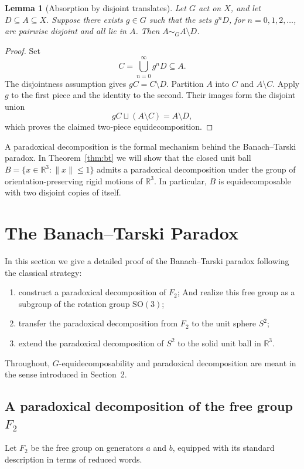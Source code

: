 \documentclass[12pt,a4paper]{article}
\theoremstyle{spaced}
\newtheorem{lemma}{Lemma}[section]
\begin{document}
\begin{lemma}[Absorption by disjoint translates]\label{lem:disjoint_translate_absorption}
	Let $G$ act on $X$, and let $D\subseteq A\subseteq X$.
	Suppose there exists $g\in G$ such that the sets $g^nD$, for
	$n=0,1,2,\dots$, are pairwise disjoint and all lie in $A$.
	Then $A\sim_G A\setminus D$.
\end{lemma}

\begin{proof}
	Set
	\[
		C=\bigcup_{n=0}^{\infty}g^nD\subseteq A.
	\]
	The disjointness assumption gives $gC=C\setminus D$.
	Partition $A$ into $C$ and $A\setminus C$. Apply $g$ to the first piece
	and the identity to the second. Their images form the disjoint union
	\[
		gC\sqcup(A\setminus C)=A\setminus D,
	\]
	which proves the claimed two-piece equidecomposition.
\end{proof}

A paradoxical decomposition is the formal mechanism behind the Banach--Tarski paradox.
In Theorem~\ref{thm:bt} we will show that the closed unit ball
\(
B = \{ x \in \mathbb{R}^3 : \|x\| \le 1 \}
\)
admits a paradoxical decomposition under the group of orientation-preserving
rigid motions of $\mathbb{R}^3$.
In particular, $B$ is equidecomposable with two disjoint copies of itself.

\section{The Banach--Tarski Paradox}

In this section we give a detailed proof of the Banach--Tarski paradox following the
classical strategy:
\begin{enumerate}
	\item construct a paradoxical decomposition of $F_2$; And realize this free group as a subgroup of the rotation group $\mathrm{SO}(3)$;
	\item transfer the paradoxical decomposition from $F_2$ to the unit sphere $S^2$;
	\item extend the paradoxical decomposition of $S^2$ to the solid unit ball in $\mathbb{R}^3$.
\end{enumerate}

Throughout, $G$-equidecomposability and paradoxical decomposition are meant in the
sense introduced in Section~2.

\subsection{A paradoxical decomposition of the free group $F_2$}
Let $F_2$ be the free group on generators $a$ and $b$, equipped with its standard
description in terms of reduced words.
\end{document}
